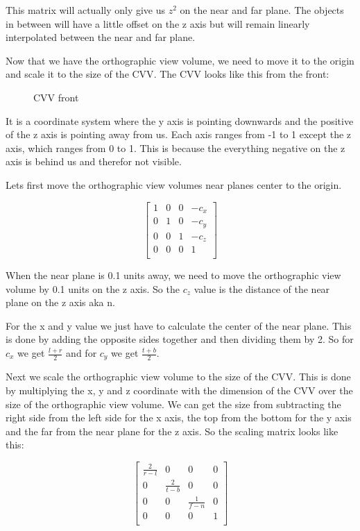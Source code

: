 \documentclass[12pt]{report} \usepackage{preamble}
\begin{document}
This matrix will actually only give us \(z^2\) on the near and far plane. The objects in between will have
a little offset on the z axis but will remain linearly interpolated between the near and far plane.

Now that we have the orthographic view volume, we need to move it to the origin and
scale it to the size of the \ac{CVV}. The \ac{CVV} looks like this from the front:

\begin{figure}[hbtp]
	\centering 
	\caption{\ac{CVV} front}
\end{figure} \Floatbarrier

It is a coordinate system where the y axis is pointing downwards and the positive of the z axis
is pointing away from us. Each axis ranges from -1 to 1 except the z axis,
which ranges from 0 to 1. This is because the everything negative on the z axis
is behind us and therefor not visible.

Lets first move the orthographic view volumes near planes center to the origin.

\[
	\begin{bmatrix}
		1 & 0 & 0 & -c_x \\
		0 & 1 & 0 & -c_y \\
		0 & 0 & 1 & -c_z \\
		0 & 0 & 0 & 1    \\
	\end{bmatrix}
\]


When the near plane is 0.1 units away, we need to move the orthographic view volume
by 0.1 units on the z axis. So the \(c_z\) value is the distance of the near
plane on the z axis aka n.

For the x and y value we just have to calculate the center of the near plane.
This is done by adding the opposite sides together and then dividing them by 2.
So for \(c_x\) we get \(\frac{l + r}{2}\) and for \(c_y\) we get \(\frac{t + b}{2}\).

Next we scale the orthographic view volume to the size of the \ac{CVV}.
This is done by multiplying the x, y and z coordinate
with the dimension of the \ac{CVV} over the size of the orthographic view volume.
We can get the size from subtracting the right side from the left side for the x axis,
the top from the bottom for the y axis and the far from the near plane for the z axis.
So the scaling matrix looks like this:

\[
	\begin{bmatrix}
		\frac{2}{r - l} & 0               & 0               & 0 \\
		0               & \frac{2}{t - b} & 0               & 0 \\
		0               & 0               & \frac{1}{f - n} & 0 \\
		0               & 0               & 0               & 1 \\
	\end{bmatrix}
\]
\end{document}
